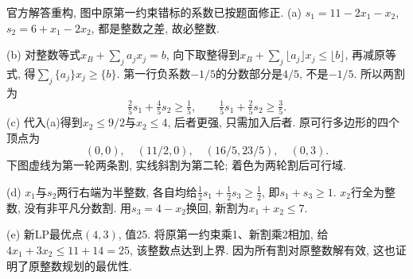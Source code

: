 \begin{solution}
官方解答重构, 图中原第一约束错标的系数已按题面修正. (a) $s_1=11-2x_1-x_2$, $s_2=6+x_1-2x_2$, 都是整数之差, 故必整数.

(b) 对整数等式$x_B+\sum_ja_jx_j=b$, 向下取整得到$x_B+\sum_j\lfloor a_j\rfloor x_j\le\lfloor b\rfloor$, 再减原等式, 得$\sum_j\{a_j\}x_j\ge\{b\}$. 第一行负系数$-1/5$的分数部分是$4/5$, 不是$-1/5$. 所以两割为
\[
\tfrac25s_1+\tfrac45s_2\ge\tfrac15,\qquad
\tfrac15s_1+\tfrac25s_2\ge\tfrac35.
\]
(c) 代入(a)得到$x_2\le9/2$与$x_2\le4$, 后者更强, 只需加入后者. 原可行多边形的四个顶点为
\[
(0,0),\quad(11/2,0),\quad(16/5,23/5),\quad(0,3).
\]
下图虚线为第一轮两条割, 实线斜割为第二轮; 着色为两轮割后可行域.

\begin{center}\end{center}
(d) $x_1$与$s_2$两行右端为半整数, 各自均给$\frac12s_1+\frac12s_3\ge\frac12$, 即$s_1+s_3\ge1$. $x_2$行全为整数, 没有非平凡分数割. 用$s_3=4-x_2$换回, 新割为$x_1+x_2\le7$.

(e) 新LP最优点$(4,3)$, 值25. 将原第一约束乘1、新割乘2相加, 给$4x_1+3x_2\le11+14=25$, 该整数点达到上界. 因为所有割对原整数解有效, 这也证明了原整数规划的最优性.
\end{solution}
